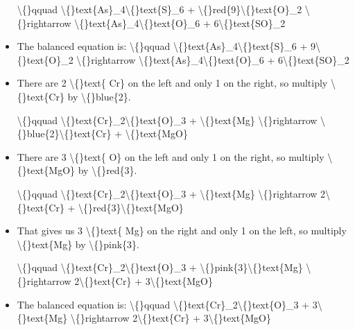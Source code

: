 \documentclass{article}
\begin{document}
\begin{itemize}
                    \textbackslash\{\}qquad
                        \textbackslash\{\}text\{As\}\_4\textbackslash\{\}text\{S\}\_6 + \textbackslash\{\}red\{9\}\textbackslash\{\}text\{O\}\_2 \textbackslash\{\}rightarrow \textbackslash\{\}text\{As\}\_4\textbackslash\{\}text\{O\}\_6 + 6\textbackslash\{\}text\{SO\}\_2
  \item The balanced equation is:
                    \textbackslash\{\}qquad
                        \textbackslash\{\}text\{As\}\_4\textbackslash\{\}text\{S\}\_6 + 9\textbackslash\{\}text\{O\}\_2 \textbackslash\{\}rightarrow \textbackslash\{\}text\{As\}\_4\textbackslash\{\}text\{O\}\_6 + 6\textbackslash\{\}text\{SO\}\_2
  \item There are 2 \textbackslash\{\}text\{ Cr\} on the left and
                        only 1 on the right, so multiply
                        \textbackslash\{\}text\{Cr\} by \textbackslash\{\}blue\{2\}.
                    
                    \textbackslash\{\}qquad
                        \textbackslash\{\}text\{Cr\}\_2\textbackslash\{\}text\{O\}\_3 + \textbackslash\{\}text\{Mg\} \textbackslash\{\}rightarrow \textbackslash\{\}blue\{2\}\textbackslash\{\}text\{Cr\} + \textbackslash\{\}text\{MgO\}
  \item There are 3 \textbackslash\{\}text\{ O\} on the left and
                        only 1 on the right, so multiply
                        \textbackslash\{\}text\{MgO\} by \textbackslash\{\}red\{3\}.
                    
                    \textbackslash\{\}qquad
                        \textbackslash\{\}text\{Cr\}\_2\textbackslash\{\}text\{O\}\_3 + \textbackslash\{\}text\{Mg\} \textbackslash\{\}rightarrow 2\textbackslash\{\}text\{Cr\} + \textbackslash\{\}red\{3\}\textbackslash\{\}text\{MgO\}
  \item That gives us 3 \textbackslash\{\}text\{ Mg\} on the right and
                        only 1 on the left, so multiply
                        \textbackslash\{\}text\{Mg\} by \textbackslash\{\}pink\{3\}.
                    
                    \textbackslash\{\}qquad
                        \textbackslash\{\}text\{Cr\}\_2\textbackslash\{\}text\{O\}\_3 + \textbackslash\{\}pink\{3\}\textbackslash\{\}text\{Mg\} \textbackslash\{\}rightarrow 2\textbackslash\{\}text\{Cr\} + 3\textbackslash\{\}text\{MgO\}
  \item The balanced equation is:
                    \textbackslash\{\}qquad
                        \textbackslash\{\}text\{Cr\}\_2\textbackslash\{\}text\{O\}\_3 + 3\textbackslash\{\}text\{Mg\} \textbackslash\{\}rightarrow 2\textbackslash\{\}text\{Cr\} + 3\textbackslash\{\}text\{MgO\}
\end{itemize}
\end{document}
